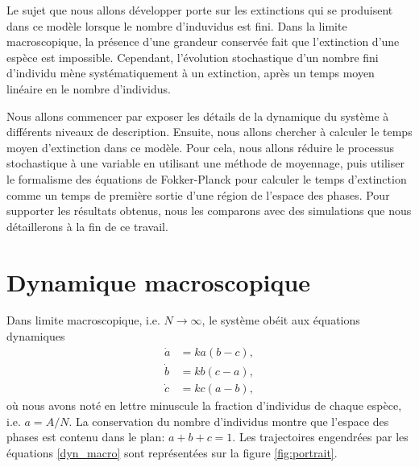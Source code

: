 \documentclass[openany,a4paper,12pt]{article}
\begin{document}
\par Le sujet que nous allons développer porte sur les extinctions qui se produisent dans ce modèle lorsque le nombre d'induvidus est fini. Dans la limite macroscopique, la présence d'une grandeur conservée fait que l'extinction d'une espèce est impossible. Cependant, l'évolution stochastique d'un nombre fini d'individu mène systématiquement à un extinction, après un temps moyen linéaire en le nombre d'individus. 

\par Nous allons commencer par exposer les détails de la dynamique du système à différents niveaux de description. Ensuite, nous allons chercher à calculer le temps moyen d'extinction dans ce modèle. Pour cela, nous allons réduire le processus stochastique à une variable en utilisant une méthode de moyennage, puis utiliser le formalisme des équations de Fokker-Planck pour calculer le temps d'extinction comme un temps de première sortie d'une région de l'espace des phases. Pour supporter les résultats obtenus, nous les comparons avec des simulations que nous détaillerons à la fin de ce travail. 


\section{Dynamique macroscopique}
\label{section_macro}

\par Dans limite macroscopique, i.e. $N\rightarrow \infty$, le système obéit aux équations dynamiques
%
\begin{equation}\label{dyn_macro}
\begin{split}
	\dot a &= ka(b-c), \\
	\dot b &= kb(c-a), \\
	\dot c &= kc(a-b),
\end{split}
\end{equation}
%
où nous avons noté en lettre minuscule la fraction d'individus de chaque espèce, i.e. $a=A/N$. La conservation du nombre d'individus montre que l'espace des phases est contenu dans le plan: $a+b+c=1$. Les trajectoires engendrées par les équations \ref{dyn_macro} sont représentées sur la figure \ref{fig:portrait}.
\end{document}

